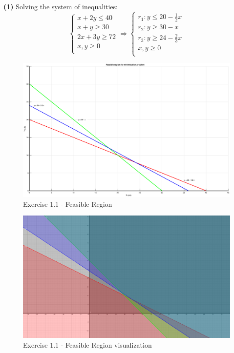\documentclass[unicode,11pt,a4paper,oneside,numbers=endperiod,openany]{scrartcl}
\begin{document}
\vspace{0.5cm}
\textbf{(1)}
Solving the system of inequalities:
\begin{equation*}
	\begin{cases}
		x + 2y  \leq 40 \\
		x + y   \geq 30 \\
		2x + 3y \geq 72 \\
		x, y \geq 0     \\
	\end{cases}
	\Rightarrow
	\begin{cases}
		r_1 : y \leq 20 - \frac{1}{2} x \\
		r_2 : y \geq 30 - x             \\
		r_3 : y \geq 24 - \frac{2}{3} x \\
		x, y \geq0                      \\
	\end{cases}
\end{equation*}

\begin{figure}[H]
	\centering
	\caption{Exercise 1.1 - Feasible Region}
	\label{fig:ex1-1}
	\includegraphics[width=\textwidth, trim={0cm 0cm 0cm 0cm}]{./figures/ex1-1.eps}
\end{figure}

\begin{figure}[H]
	\centering
	\caption{Exercise 1.1 - Feasible Region visualization}
	\label{fig:ex1-1-geogebra}
	\includegraphics[width=\textwidth, trim={35cm 11cm 33cm 20cm}, clip]{./figures/ex1-1-geogebra.png}
\end{figure}
\end{document}
